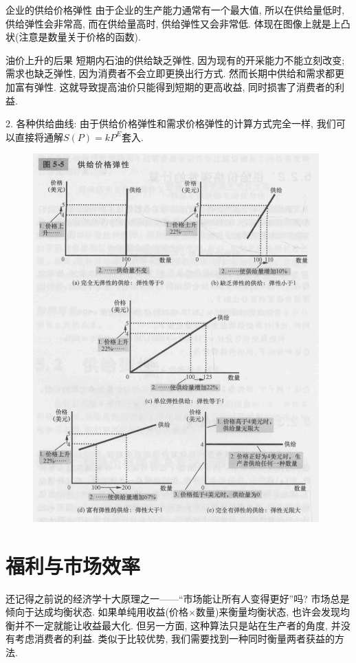 \begin{example}{企业的供给价格弹性}
	由于企业的生产能力通常有一个最大值, 所以在供给量低时, 供给弹性会非常高, 而在供给量高时, 供给弹性又会非常低. 体现在图像上就是上凸状(注意是数量关于价格的函数). 
\end{example}

\begin{example}{油价上升的后果}
	短期内石油的供给缺乏弹性, 因为现有的开采能力不能立刻改变; 需求也缺乏弹性, 因为消费者不会立即更换出行方式. 然而长期中供给和需求都更加富有弹性. 这就导致提高油价只能得到短期的更高收益, 同时损害了消费者的利益. 
\end{example}

2. 各种供给曲线: 由于供给价格弹性和需求价格弹性的计算方式完全一样, 我们可以直接将通解$S(P)=kP^{E}$套入. 

\begin{figure}[H]
	\centering
	\includegraphics[width=11cm]{attachment/Fig5_5.png}
\end{figure}

\newpage
\section{福利与市场效率}

还记得之前说的经济学十大原理之一——“市场能让所有人变得更好”吗? 市场总是倾向于达成均衡状态. 如果单纯用收益(价格$\times$数量)来衡量均衡状态, 也许会发现均衡并不一定就能让收益最大化. 但另一方面, 这种算法只是站在生产者的角度, 并没有考虑消费者的利益. 类似于比较优势, 我们需要找到一种同时衡量两者获益的方法. 

